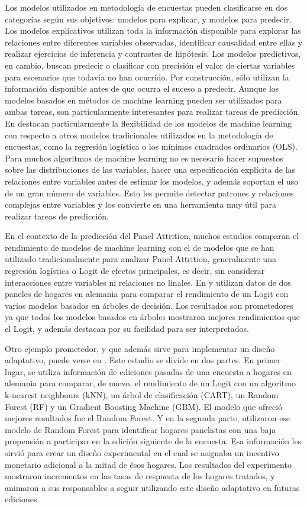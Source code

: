 Los modelos utilizados en metodología de encuestas pueden clasificarse en dos categorías según sus objetivos: modelos para explicar, y modelos para predecir. Los modelos explicativos utilizan toda la información disponible para explorar las relaciones entre diferentes variables observadas, identificar causalidad entre ellas y realizar ejercicios de inferencia y contrastes de hipótesis. Los modelos predictivos, en cambio, buscan predecir o clasificar con precisión el valor de ciertas variables para escenarios que todavía no han ocurrido. Por construcción, sólo utilizan la información disponible antes de que ocurra el suceso a predecir. Aunque los modelos basados en métodos de machine learning pueden ser utilizados para ambas tareas, son particularmente interesantes para realizar tareas de predicción. En \cite{buskirk2018introduction} destacan particularmente la flexibilidad de los modelos de machine learning con respecto a otros modelos tradicionales utilizados en la metodología de encuestas, como la regresión logística o los mínimos cuadrados ordinarios (OLS). Para muchos algoritmos de machine learning no es necesario hacer supuestos sobre las distribuciones de las variables, hacer una especificación explícita de las relaciones entre variables antes de estimar los modelos, y además soportan el uso de un gran número de variables. Esto les permite detectar patrones y relaciones complejas entre variables y los convierte en una herramienta muy útil para realizar tareas de predicción.

En el contexto de la predicción del Panel Attrition, muchos estudios comparan el rendimiento de modelos de machine learning con el de modelos que se han utilizado tradicionalmente para analizar Panel Attrition, generalmente una regresión logística o Logit de efectos principales, es decir, sin considerar interacciones entre variables ni relaciones no linales. En \cite{kern2019tree} y \cite{kern2021predicting} utilizan datos de dos paneles de hogares en alemania para comparar el rendimiento de un Logit con varios modelos basados en árboles de decisión. Los resultados son prometedores ya que todos los modelos basados en árboles mostraron mejores rendimientos que el Logit, y además destacan por su facilidad para ser interpretados.

Otro ejemplo prometedor, y que además sirve para implementar un diseño adaptativo, puede verse en \cite{beste2023case}. Este estudio se divide en dos partes. En primer lugar, se utiliza información de ediciones pasadas de una encuesta a hogares en alemania para comparar, de nuevo, el rendimiento de un Logit con un algoritmo k-nearest neighbours (kNN), un árbol de clasificación (CART), un Random Forest (RF) y un Gradient Boosting Machine (GBM). El modelo que ofreció mejores resultados fue el Random Forest. Y en la segunda parte, utilizaron ese modelo de Random Forest para identificar hogares panelistas con una baja propensión a participar en la edición siguiente de la encuesta. Esa información les sirvió para crear un diseño experimental en el cual se asignaba un incentivo monetario adicional a la mitad de ésos hogares. Los resultados del experimento mostraron incrementos en las tasas de respuesta de los hogares tratados, y animaron a sus responsables a seguir utilizando este diseño adaptativo en futuras ediciones.

